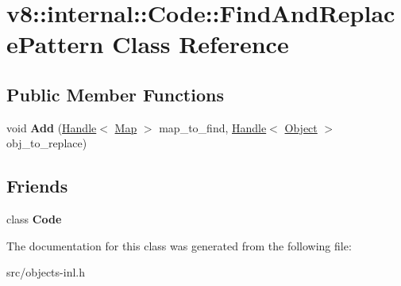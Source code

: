 \hypertarget{classv8_1_1internal_1_1_code_1_1_find_and_replace_pattern}{}\section{v8\+:\+:internal\+:\+:Code\+:\+:Find\+And\+Replace\+Pattern Class Reference}
\label{classv8_1_1internal_1_1_code_1_1_find_and_replace_pattern}
\subsection*{Public Member Functions}
\begin{DoxyCompactItemize}
\item 
\hypertarget{classv8_1_1internal_1_1_code_1_1_find_and_replace_pattern_a0974183977f76457b00b85ab22a32984}{}void {\bfseries Add} (\hyperlink{classv8_1_1internal_1_1_handle}{Handle}$<$ \hyperlink{classv8_1_1internal_1_1_map}{Map} $>$ map\+\_\+to\+\_\+find, \hyperlink{classv8_1_1internal_1_1_handle}{Handle}$<$ \hyperlink{classv8_1_1internal_1_1_object}{Object} $>$ obj\+\_\+to\+\_\+replace)\label{classv8_1_1internal_1_1_code_1_1_find_and_replace_pattern_a0974183977f76457b00b85ab22a32984}

\end{DoxyCompactItemize}
\subsection*{Friends}
\begin{DoxyCompactItemize}
\item 
\hypertarget{classv8_1_1internal_1_1_code_1_1_find_and_replace_pattern_aedc338bfccace8e957c4170e741fd43a}{}class {\bfseries Code}\label{classv8_1_1internal_1_1_code_1_1_find_and_replace_pattern_aedc338bfccace8e957c4170e741fd43a}

\end{DoxyCompactItemize}


The documentation for this class was generated from the following file\+:\begin{DoxyCompactItemize}
\item 
src/objects-\/inl.\+h\end{DoxyCompactItemize}
